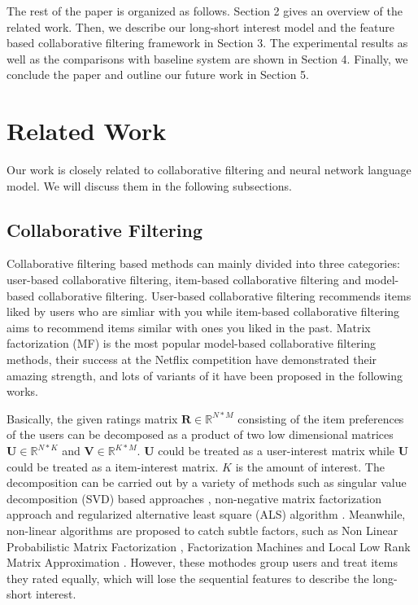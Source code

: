 \documentclass{sig-alternate-05-2015}
\begin{document}
The rest of the paper is organized as follows. Section 2 gives an overview of the related work.
Then, we describe our long-short interest model and the feature based collaborative filtering
framework in Section 3. The experimental results as well as the comparisons with
baseline system are shown in Section 4.
Finally, we conclude the paper and outline our future work in Section 5.

\section{Related Work}
Our work is closely related to collaborative filtering and
neural network language model.
We will discuss them in the following subsections.

\subsection{Collaborative Filtering}
Collaborative filtering based methods can mainly divided into three categories:
user-based collaborative filtering, item-based collaborative filtering and
model-based collaborative filtering.
User-based collaborative filtering \cite{resnick1994grouplens} recommends
items liked by users who are simliar with you
while item-based collaborative filtering \cite{sarwar2001item} aims to
recommend items similar with ones you liked in the past.
Matrix factorization (MF) is the most popular model-based collaborative filtering methods,
their success at the Netflix competition \cite{koren2009matrix, bennett2007netflix}
have demonstrated their amazing strength,
and lots of variants of it have been proposed in the following works.

Basically, the given ratings matrix $\mathbf{R} \in \mathbb{R}^{N*M}$
consisting of the item preferences of the users can be decomposed as
a product of two low dimensional matrices $\mathbf{U} \in \mathbb{R}^{N*K}$
and $\mathbf{V} \in \mathbb{R}^{K*M}$.
$\mathbf{U}$ could be treated as a user-interest matrix while
$\mathbf{U}$ could be treated as a item-interest matrix.
$K$ is the amount of interest.
The decomposition can be carried out by a variety of methods
such as singular value decomposition (SVD) based approaches \cite{mazumder2010spectral},
non-negative matrix factorization approach \cite{lee2001algorithms}
and regularized alternative least square (ALS) algorithm \cite{zhou2008large}.
Meanwhile, non-linear algorithms are proposed to catch subtle factors,
such as Non Linear Probabilistic Matrix Factorization \cite{lawrence2009non},
Factorization Machines \cite{rendle2010factorization} and
Local Low Rank Matrix Approximation \cite{lee2013local}.
However, these mothodes group users and treat items they rated equally,
which will lose the sequential features to describe the long-short interest.
\end{document}
